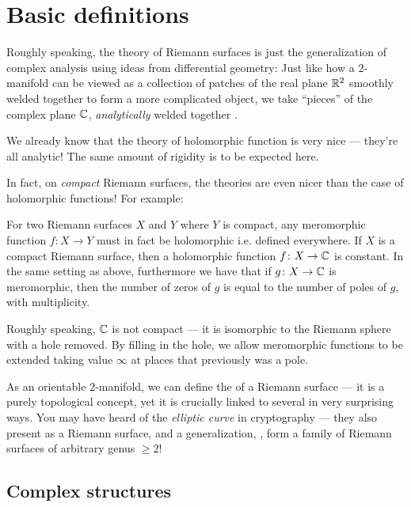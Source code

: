 \chapter{Basic definitions}
\label{ch:complex_structure_def}

Roughly speaking, the theory of Riemann surfaces is just the generalization of complex analysis
using ideas from differential geometry:
Just like how a $2$-manifold can be viewed as a collection of patches of the real plane $\mathbb R^2$
smoothly welded together to form a more complicated object,
we take ``pieces'' of the complex plane $\mathbb C$, \emph{analytically} welded together .

We already know that the theory of holomorphic function is very nice --- they're all analytic!
The same amount of rigidity is to be expected here.

In fact, on \emph{compact} Riemann surfaces, the theories are even nicer than the case of
holomorphic functions! For example:
\begin{itemize}
	\ii For two Riemann surfaces $X$ and $Y$ where $Y$ is compact, any meromorphic function $f
	\colon X \to Y$ must in fact be holomorphic i.e. defined everywhere.
	\ii If $X$ is a compact Riemann surface, then a holomorphic function $f \colon X \to \mathbb C$ is
	constant.
	\ii In the same setting as above, furthermore we have that if $g \colon X \to \mathbb C$ is
	meromorphic, then the number of zeros of $g$ is equal to the number of poles of $g$, with
	multiplicity.
\end{itemize}

\begin{remark}
Roughly speaking, $\mathbb C$ is not compact --- it is isomorphic to the Riemann sphere with a hole
removed. By filling in the hole, we allow meromorphic functions to be extended taking value $\infty$
at places that previously was a pole.
\end{remark}

As an orientable $2$-manifold, we can define the  of a Riemann surface --- it is a
purely topological concept, yet it is crucially linked to several in very surprising ways.
You may have heard of the \emph{elliptic curve} in cryptography --- they also present as a Riemann
surface, and a generalization, , form a family of Riemann surfaces of
arbitrary genus $\geq 2$!

\section{Complex structures}

